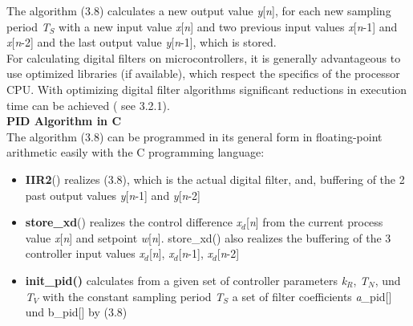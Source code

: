 The algorithm (3.8) calculates a new output value \textit{y}[\textit{n}], for each new sampling period \textit{T${}_{S}$} with a new input value \textit{x}[\textit{n}] and two previous input values \textit{x}[\textit{n}-1] and \textit{x}[\textit{n}-2] and the last output value \textit{y}[\textit{n}-1], which is stored.\\

For calculating digital filters on microcontrollers, it is generally advantageous to use optimized libraries (if available), which respect the specifics of the processor CPU. With optimizing digital filter algorithms significant reductions in execution time can be achieved ( see 3.2.1).\\

{\rot\bf PID Algorithm in C }\\

The algorithm (3.8) can be programmed in its general form in floating-point arithmetic easily with the C programming language:\\

\begin{itemize}
\item  \textbf{IIR2}() realizes (3.8), which is the actual digital filter, and, buffering of the 2 past output values \textit{y}[\textit{n}-1] and \textit{y}[\textit{n}-2]

\item  \textbf{store\_xd}() realizes the control difference \textit{x${}_{d}$}[\textit{n}] from the current process value \textit{x}[\textit{n}] and setpoint \textit{w}[\textit{n}]. store\_xd() also realizes the buffering of the 3 controller input values \textit{x${}_{d}$}[\textit{n}], \textit{x${}_{d}$}[\textit{n}-1], \textit{x${}_{d}$}[\textit{n}-2]

\item  \textbf{init\_pid()} calculates from a given set of controller parameters \textit{k${}_{R}$}, \textit{T${}_{N}$}, und \textit{T${}_{V}$} with the constant sampling period \textit{T${}_{S}$} a set of filter coefficients \textit{a\_}pid[] und  b\_pid[] by (3.8)
\end{itemize}

